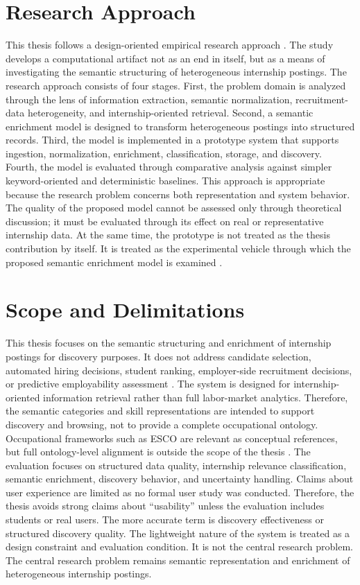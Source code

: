 \section{Research Approach}
This thesis follows a design-oriented empirical research approach \cite{hevner2004design}. The study develops a
computational artifact not as an end in itself, but as a means of investigating the semantic
structuring of heterogeneous internship postings.
The research approach consists of four stages. First, the problem domain is analyzed through the
lens of information extraction, semantic normalization, recruitment-data heterogeneity, and
internship-oriented retrieval. Second, a semantic enrichment model is designed to transform
heterogeneous postings into structured records. Third, the model is implemented in a prototype
system that supports ingestion, normalization, enrichment, classification, storage, and discovery.
Fourth, the model is evaluated through comparative analysis against simpler keyword-oriented
and deterministic baselines.
This approach is appropriate because the research problem concerns both representation and
system behavior. The quality of the proposed model cannot be assessed only through theoretical
discussion; it must be evaluated through its effect on real or representative internship data. At the
same time, the prototype is not treated as the thesis contribution by itself. It is treated as the
experimental vehicle through which the proposed semantic enrichment model is examined \cite{hevner2004design}.

\section{Scope and Delimitations}
This thesis focuses on the semantic structuring and enrichment of internship postings for
discovery purposes. It does not address candidate selection, automated hiring decisions, student
ranking, employer-side recruitment decisions, or predictive employability assessment \cite{hunkenschroer2022ethics, rigotti2024fairness}.
The system is designed for internship-oriented information retrieval rather than full labor-market
analytics. Therefore, the semantic categories and skill representations are intended to support
discovery and browsing, not to provide a complete occupational ontology. Occupational
frameworks such as ESCO are relevant as conceptual references, but full ontology-level
alignment is outside the scope of the thesis \cite{peterson2001occupational, staab2009handbook}.
The evaluation focuses on structured data quality, internship relevance classification, semantic
enrichment, discovery behavior, and uncertainty handling. Claims about user experience are limited as no formal user study was conducted. Therefore, the thesis avoids strong claims about ``usability'' unless the evaluation includes students or real users. The more accurate term is discovery effectiveness or structured discovery quality.
The lightweight nature of the system is treated as a design constraint and evaluation condition. It
is not the central research problem. The central research problem remains semantic
representation and enrichment of heterogeneous internship postings.



